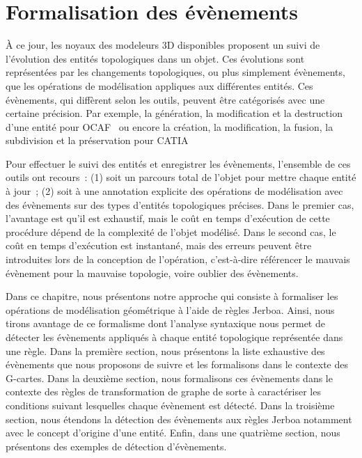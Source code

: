 \chapter[Formalisation des évènements]{Formalisation des évènements}
\label{cha:formalisation-evenements}

À ce jour, les noyaux des modeleurs 3D disponibles proposent un suivi de
l'évolution des entités topologiques dans un objet. %
Ces évolutions sont représentées par les changements topologiques, ou plus
simplement évènements, que les opérations de modélisation appliques aux
différentes entités. %
Ces évènements, qui diffèrent selon les outils, peuvent être catégorisés avec
une certaine précision. %
Par exemple, la génération, la modification et la destruction d'une entité pour
OCAF~\cite{OCAF} ou encore la création, la modification, la fusion, la
subdivision et la préservation pour CATIA~\cite{dassaultCATIA} %

Pour effectuer le suivi des entités et enregistrer les évènements, l'ensemble de
ces outils ont recours~: (1) soit un parcours total de l'objet pour mettre
chaque entité à jour~; (2) soit à une annotation explicite des opérations de
modélisation avec des évènements sur des types d'entités topologiques
précises. %
Dans le premier cas, l'avantage est qu'il est exhaustif, mais le coût en temps
d'exécution de cette procédure dépend de la complexité de l'objet modélisé. %
Dans le second cas, le coût en temps d'exécution est instantané, mais des
erreurs peuvent être introduites lors de la conception de l'opération,
c'est-à-dire référencer le mauvais évènement pour la mauvaise topologie, voire
oublier des évènements. %

Dans ce chapitre, nous présentons notre approche qui consiste à formaliser les
opérations de modélisation géométrique à l'aide de règles Jerboa. %
Ainsi, nous tirons avantage de ce formalisme dont l'analyse syntaxique nous
permet de détecter les évènements appliqués à chaque entité topologique
représentée dans une règle. %
Dans la première section, nous présentons la liste exhaustive des évènements que
nous proposons de suivre et les formalisons dans le contexte des G-cartes. %
Dans la deuxième section, nous formalisons ces évènements dans le contexte des
règles de transformation de graphe de sorte à caractériser les conditions
suivant lesquelles chaque évènement est détecté. %
Dans la troisième section, nous étendons la détection des évènements aux règles
Jerboa notamment avec le concept d'origine d'une entité. %
Enfin, dans une quatrième section, nous présentons des exemples de détection
d'évènements. %



